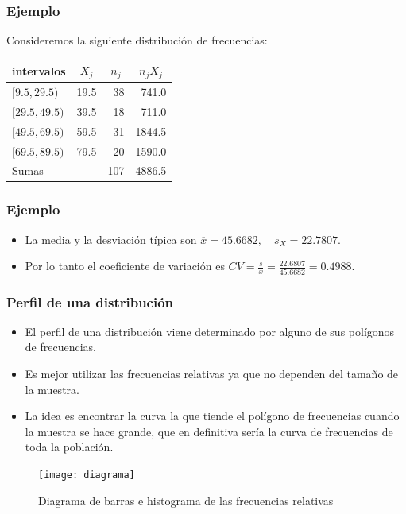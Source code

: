 \begin{frame}
\frametitle{Ejemplo}
Consideremos la siguiente distribución de frecuencias: 
\begin{center}
\begin{tabular}{lccc}
intervalos     & $X_j$ & $n_j$ & $n_jX_j$\\ \hline $[9.5,29.5)$  & 19.5 & \ 38  & \ 741.0
\\ $[29.5,49.5)$ & 39.5 & \ 18  & \ 711.0  \\ $[49.5,69.5)$ & 59.5 & \ 31  & 1844.5 \\
$[69.5,89.5)$ & 79.5 & \ 20  & 1590.0   \\ \hline Sumas     &      & 107 & 4886.5
\end{tabular}
\end{center}
\end{frame}

\begin{frame}
\frametitle{Ejemplo}
\begin{itemize}
\item La media   y la desviación  típica son $\overline{x}=45.6682,\quad s_X=22.7807$.
\item Por lo tanto el coeficiente de variación es $CV=\frac{s}{\overline{x}}=\frac{22.6807}{45.6682}=0.4988$.
\end{itemize}
\end{frame}

\begin{frame}
\frametitle{Perfil de una distribución}
\begin{itemize} 
\item El perfil de una distribución viene determinado por alguno de sus polígonos de
frecuencias. 
\item Es mejor utilizar las frecuencias relativas ya que no dependen del tamaño de
la muestra. 
\item La idea es encontrar la curva la que tiende el polígono de frecuencias
cuando la muestra se hace grande, que en definitiva sería la curva de frecuencias de toda
la población.
\end{itemize}
\end{frame}

\begin{frame}
\begin{figure}
\begin{center}
\texttt{[image: diagrama]}
\end{center}
\caption{Diagrama de barras e  histograma de las frecuencias relativas }
\label{RELATIVES}
\end{figure}
\end{frame}

